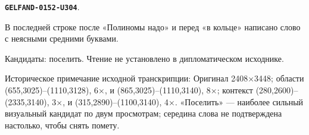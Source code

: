 \documentclass[11pt]{article}
\theoremstyle{definition}
\theoremstyle{remark}
\begin{document}
\par\noindent\leavevmode{}\label{GELFAND-0152-U304}\label{GELFAND-P001401:last-line-word:note}\textbf{\texttt{GELFAND-0152-U304}}.\nopagebreak[4]\par
В последней строке после «Полиномы надо» и перед «в кольце» написано слово с неясными средними буквами.\par
Кандидаты: поселить. Чтение не установлено в дипломатическом исходнике.\par
Историческое примечание исходной транскрипции: Оригинал 2408×3448; области (655,3025)–(1110,3128), 6×, и (865,3025)–(1110,3140), 8×; контекст (280,2600)–(2335,3140), 3×, и (315,2890)–(1100,3140), 4×. «Поселить» — наиболее сильный визуальный кандидат по двум просмотрам; середина слова не подтверждена настолько, чтобы снять помету.\par\medskip
\end{document}
